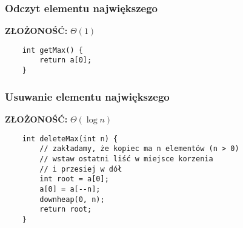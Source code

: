 \documentclass[algorytmy.tex]{subfiles}
\begin{document}
    \subsubsection{Odczyt elementu największego}
        \textbf{ZŁOŻONOŚĆ:  } $\Theta(1)$
\begin{verbatim}
    int getMax() {
        return a[0];
    }
\end{verbatim}

    \subsubsection{Usuwanie elementu największego}
        \textbf{ZŁOŻONOŚĆ:  } $\Theta(\log{n})$
\begin{verbatim}
    int deleteMax(int n) {
        // zakładamy, że kopiec ma n elementów (n > 0)
        // wstaw ostatni liść w miejsce korzenia
        // i przesiej w dół
        int root = a[0];
        a[0] = a[--n];
        downheap(0, n);
        return root;
    }
\end{verbatim}
\end{document}
